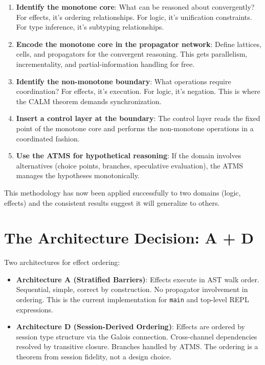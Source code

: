\documentclass[11pt]{article}
\begin{document}
\begin{enumerate}
\item \textbf{Identify the monotone core}: What can be reasoned about convergently?
For effects, it's ordering relationships. For logic, it's unification
constraints. For type inference, it's subtyping relationships.

\item \textbf{Encode the monotone core in the propagator network}: Define lattices,
cells, and propagators for the convergent reasoning. This gets parallelism,
incrementality, and partial-information handling for free.

\item \textbf{Identify the non-monotone boundary}: What operations require
coordination? For effects, it's execution. For logic, it's negation. This
is where the CALM theorem demands synchronization.

\item \textbf{Insert a control layer at the boundary}: The control layer reads the
fixed point of the monotone core and performs the non-monotone operations
in a coordinated fashion.

\item \textbf{Use the ATMS for hypothetical reasoning}: If the domain involves
alternatives (choice points, branches, speculative evaluation), the ATMS
manages the hypotheses monotonically.
\end{enumerate}

This methodology has now been applied successfully to two domains (logic,
effects) and the consistent results suggest it will generalize to others.
\section{The Architecture Decision: A + D}
\label{sec:org24f402c}

Two architectures for effect ordering:

\begin{itemize}
\item \textbf{Architecture A (Stratified Barriers)}: Effects execute in AST walk order.
Sequential, simple, correct by construction. No propagator involvement in
ordering. This is the current implementation for \texttt{main} and top-level
REPL expressions.

\item \textbf{Architecture D (Session-Derived Ordering)}: Effects are ordered by session
type structure via the Galois connection. Cross-channel dependencies resolved
by transitive closure. Branches handled by ATMS. The ordering is a theorem
from session fidelity, not a design choice.
\end{itemize}
\end{document}
